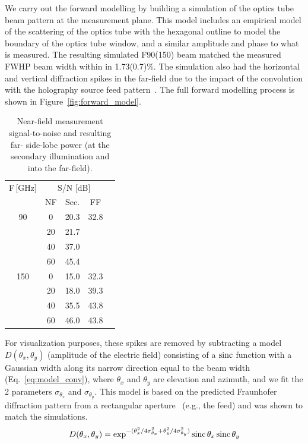 We carry out the forward modelling by building a simulation of the optics tube beam pattern at the measurement plane.  This model includes an empirical model of the scattering of the optics tube with the hexagonal outline to model the boundary of the optics tube window, and a similar amplitude and phase to what is measured.  The resulting simulated F90(150) beam matched the measured FWHP beam width within in 1.73(0.7)\%.  The simulation also had the horizontal and vertical diffraction spikes in the far-field due to the impact of the convolution with the holography source feed pattern~\cite{Goodman2005-ne}.  The full forward modelling process is shown in Figure~\ref{fig:forward_model}.
\begin{table}[ht]
\centering
\begin{tabular}{|c|c|c|c|c|}
\hline
F\,[GHz] & \multicolumn{3}{c|}{S/N [dB]}\\
& NF& Sec.& FF\\
\hline
 90      & 0 & 20.3  & 32.8\\
         & 20& 21.7 & \\
         & 40& 37.0 & \\
         & 60& 45.4 & \\
 150     & 0 & 15.0 & 32.3 \\
         & 20& 18.0 & 39.3\\
         & 40& 35.5 & 43.8\\
         & 60& 46.0 & 43.8\\
 \hline
\end{tabular}
\caption{Near-field measurement signal-to-noise and resulting far- side-lobe power (at the secondary illumination and into the far-field).}
\label{tab:fft_sn}
\end{table}
For visualization purposes, these spikes are removed by subtracting a model $D(\theta_x,\theta_y)$ (amplitude of the electric field) consisting of a $\operatorname{sinc}$ function with a Gaussian width along its narrow direction equal to the beam width (Eq.~\ref{eq:model_conv}), where $\theta_x$ and $\theta_y$ are elevation and azimuth, and we fit the 2 parameters $\sigma_{\theta_x}$ and $\sigma_{\theta_y}$.  This model is based on the predicted Fraunhofer diffraction pattern from a rectangular aperture~\cite{Goodman2005-ne} (e.g., the feed) and was shown to match the simulations.
\begin{equation}
    D(\theta_x,\theta_y) = \exp^{-(\theta_x^2/4\sigma_{\theta_x}^2 +\theta_y^2/4\sigma_{\theta_y}^2 )}\operatorname{sinc}{\theta_x}\operatorname{sinc}{\theta_y}
    \label{eq:model_conv}
\end{equation}
